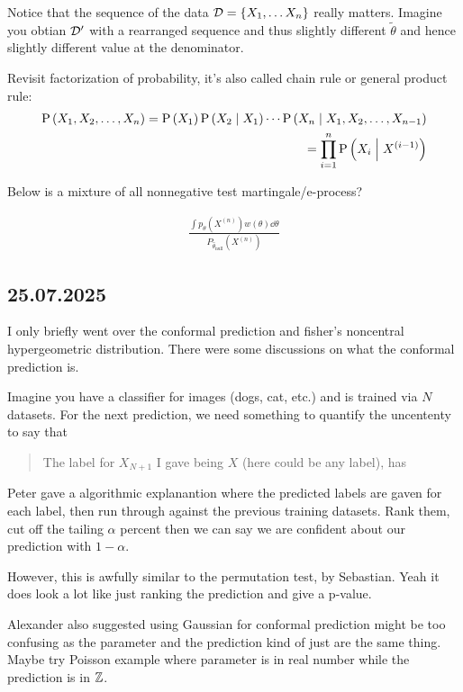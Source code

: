 Notice that the sequence of the data $\mathcal{D}=\{X_1,\dots X_n\}$ really matters.
Imagine you obtian $\mathcal{D}'$ with a rearranged sequence and thus slightly
different $\tilde{\theta}$ and hence slightly different value at the
denominator.

Revisit factorization of probability, it's also called chain rule or general product rule:
\begin{align*}
	\PR{X_1,X_2,\dots,X_n} = \PR{X_1}\condPR{X_2}{X_1}\cdots \condPR{X_n}{X_1,X_2,\dots,X_{n-1}} \\
	= \prod_{i=1}^n \condPR{X_i}{X^{(i-1)}}
\end{align*}

\begin{question}
	Below is a mixture of all nonnegative test martingale/e-process?
\end{question}

\begin{align*}
	\frac{\int p_{\theta}(X^{(n)}) w(\theta) \dd{\theta}}{P_{\hat{\theta}_{\mathrm{null}}}(X^{(n)})}
\end{align*}


\subsection*{25.07.2025} I only briefly went over the conformal prediction and fisher's noncentral hypergeometric distribution.
There were some discussions on what the conformal prediction is.

Imagine you have a classifier for images (dogs, cat, etc.) and is trained via $N$ datasets.
For the next prediction, we need something to quantify the uncententy to say that
\begin{quote}
	The label for $X_{N+1}$ I gave being $X$ (here could be any label), has
\end{quote}

Peter gave a algorithmic explanantion where the predicted labels are gaven for each label,
then run through against the previous training datasets. Rank them, cut off the tailing $\alpha$
percent then we can say we are confident about our prediction with $1-\alpha$.

However, this is awfully similar to the permutation test, by Sebastian.
Yeah it does look a lot like just ranking the prediction and give a p-value.

Alexander also suggested using Gaussian for conformal prediction might be too confusing
as the parameter and the prediction kind of just are the same thing.
Maybe try Poisson example where parameter is in real number while the prediction is in $\mathbb{Z}$.

